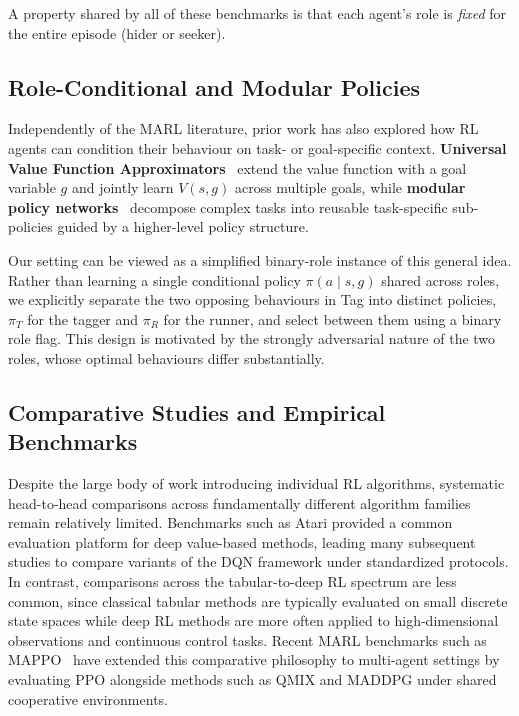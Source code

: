 \documentclass[conference]{IEEEtran}
\begin{document}
A property shared by all of these benchmarks is that each agent's role
is \emph{fixed} for the entire episode (hider or seeker).

\subsection{Role-Conditional and Modular Policies}

Independently of the MARL literature, prior work has also explored how
RL agents can condition their behaviour on task- or goal-specific
context. \textbf{Universal Value Function Approximators}~\cite{schaul2015}
extend the value function with a goal variable $g$ and jointly learn
$V(s, g)$ across multiple goals, while \textbf{modular policy
networks}~\cite{andreas2017} decompose complex tasks into reusable
task-specific sub-policies guided by a higher-level policy structure.

Our setting can be viewed as a simplified binary-role instance of this
general idea. Rather than learning a single conditional policy
$\pi(a \mid s, g)$ shared across roles, we explicitly separate the two
opposing behaviours in Tag into distinct policies,
$\pi_T$ for the tagger and $\pi_R$ for the runner, and select between
them using a binary role flag. This design is motivated by the strongly
adversarial nature of the two roles, whose optimal behaviours differ
substantially.

\subsection{Comparative Studies and Empirical Benchmarks}

Despite the large body of work introducing individual RL algorithms,
systematic head-to-head comparisons across fundamentally different
algorithm families remain relatively limited. Benchmarks such as Atari
provided a common evaluation platform for deep value-based methods,
leading many subsequent studies to compare variants of the DQN
framework under standardized protocols. In contrast, comparisons across
the tabular-to-deep RL spectrum are less common, since classical
tabular methods are typically evaluated on small discrete state spaces
while deep RL methods are more often applied to high-dimensional
observations and continuous control tasks. Recent MARL benchmarks such
as MAPPO~\cite{yu2022} have extended this comparative philosophy to
multi-agent settings by evaluating PPO alongside methods such as QMIX
and MADDPG under shared cooperative environments.
\end{document}
